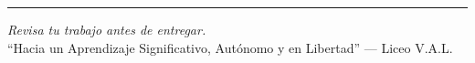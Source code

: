 \documentclass[12pt, letterpaper]{article}
\begin{document}
	\vspace{0.8cm}
	\noindent\rule{14cm}{0.8pt}
	\begin{center}
		\small\textit{Revisa tu trabajo antes de entregar.}\\
		``Hacia un Aprendizaje Significativo, Autónomo y en Libertad''
		--- Liceo V.A.L.
	\end{center}
	
\end{document}
